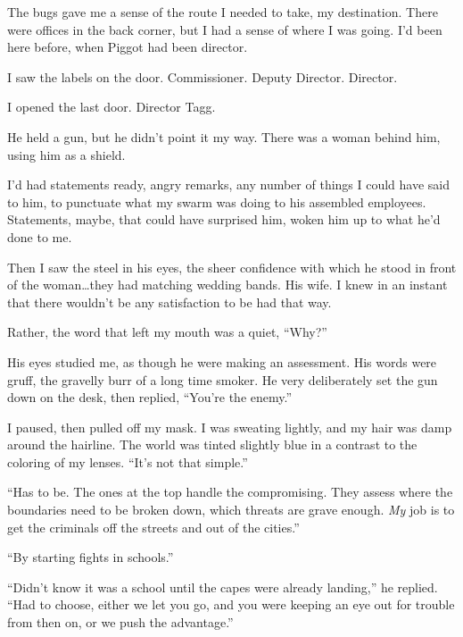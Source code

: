 The bugs gave me a sense of the route I needed to take, my destination.  There were offices in the back corner, but I had a sense of where I was going.  I'd been here before, when Piggot had been director.



I saw the labels on the door.  Commissioner.  Deputy Director.  Director.



I opened the last door.  Director Tagg.



He held a gun, but he didn't point it my way.  There was a woman behind him, using him as a shield.



I'd had statements ready, angry remarks, any number of things I could have said to him, to punctuate what my swarm was doing to his assembled employees.  Statements, maybe, that could have surprised him, woken him up to what he'd done to me.



Then I saw the steel in his eyes, the sheer confidence with which he stood in front of the woman\ldots they had matching wedding bands.  His wife.  I knew in an instant that there wouldn't be any satisfaction to be had that way.



Rather, the word that left my mouth was a quiet, ``Why?''



His eyes studied me, as though he were making an assessment.  His words were gruff, the gravelly burr of a long time smoker.  He very deliberately set the gun down on the desk, then replied, ``You're the enemy.''



I paused, then pulled off my mask.  I was sweating lightly, and my hair was damp around the hairline.  The world was tinted slightly blue in a contrast to the coloring of my lenses.  ``It's not that simple.''



``Has to be.  The ones at the top handle the compromising.  They assess where the boundaries need to be broken down, which threats are grave enough.  \emph{My} job is to get the criminals off the streets and out of the cities.''



``By starting fights in schools.''



``Didn't know it was a school until the capes were already landing,'' he replied.  ``Had to choose, either we let you go, and you were keeping an eye out for trouble from then on, or we push the advantage.''



